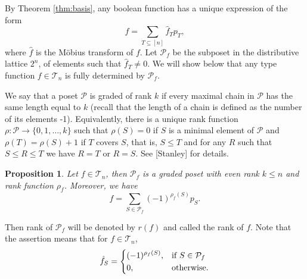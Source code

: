 \documentclass[12pt]{article}
\newtheorem{prop}{Proposition}
\theoremstyle{definition}
\theoremstyle{remark}
\def\Te{\mathcal T}
\def\Pe{\mathcal P}
\begin{document}
By Theorem \ref{thm:basis}, any boolean function has a unique expression of the form
\[
f=\sum_{T\subseteq [n]} \hat f_Tp_T,
\]
where $\hat f$ is the M\"obius transform of $f$. Let $\mathcal P_f$ be the subposet in the
distributive lattice $2^n$,  of elements such that
$\hat f_T\ne 0$. We will show below that any type function $f\in \Te_n$ is fully determined by $\Pe_f$.  





 We say that a poset $\Pe$  is graded of rank
$k$ if every maximal chain in $\Pe$ has the same length equal to $k$ (recall that the length
of a chain is defined as the number of its elements -1). Equivalently,  there is
a unique rank function $\rho: \Pe\to \{0,1,\dots,k\}$ such that $\rho(S)=0$ if $S$ is a
minimal element of $\Pe$ and $\rho(T)=\rho(S)+1$ if $T$ covers $S$, that is, $S\le T$ and for any $R$ such that
$S\le R\le T$ we have $R=T$ or $R=S$. See [Stanley] for details.

\begin{prop}\label{prop:graded} Let $f\in \Te_n$, then $\mathcal P_f$ is a graded poset
with even rank $k\le n$ and rank function $\rho_f$. Moreover, we have
\[
f=\sum_{S\in \mathcal P_f}(-1)^{\rho_f(S)}p_S.
\]


\end{prop}

Then rank of $\Pe_f$ will be denoted by $r(f)$ and called the rank of $f$. Note that the
assertion means that for $f\in \Te_n$, 
\[
\hat f_S=\begin{dcases} (-1)^{\rho_f(S)},& \text{if } S\in \Pe_f\\
0, & \text{otherwise}.
\end{dcases}
\]
\end{document}
